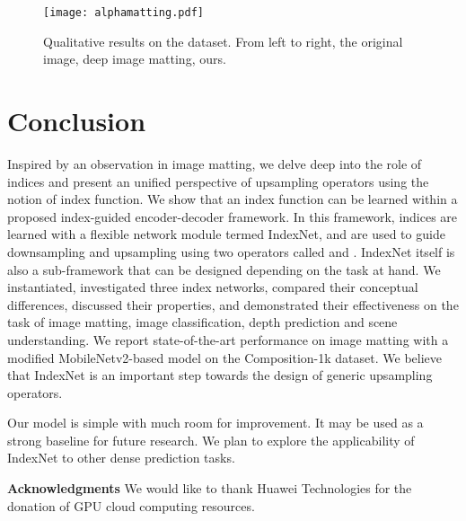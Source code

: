 \documentclass[10pt,twocolumn,letterpaper]{article}
\begin{document}
\begin{figure*}[!tb]
	\captionsetup{font=small,singlelinecheck=true}
	\setlength{\abovecaptionskip}{10pt}
	\centering
	\texttt{[image: alphamatting.pdf]}\caption{Qualitative results on the  dataset. From left to right, the original image, deep image matting, ours.}
	\label{fig:alphamatting}
\end{figure*}

\section{Conclusion}
Inspired by an observation in image matting, we delve deep into the role of indices and present an unified perspective of upsampling operators using the notion of index function. We show that an index function can be learned within a proposed index-guided encoder-decoder framework. In this framework, indices are learned with a flexible network module termed IndexNet, and are used to guide downsampling and upsampling using two operators called  and . IndexNet itself is also a sub-framework that can be designed depending on the task at hand. We instantiated, investigated three index networks, compared their conceptual differences, discussed their properties, and demonstrated their effectiveness on the task of image matting, image classification, depth prediction and scene understanding. We report state-of-the-art performance on image matting with a modified MobileNetv2-based model on the Composition-1k dataset. We believe that
IndexNet is an important step towards the design of generic upsampling operators.

Our model is simple with much room for improvement. It may be used as a strong baseline for future research. We plan to explore the applicability of IndexNet to other dense prediction tasks.


{\bf Acknowledgments}
We would like to thank Huawei Technologies for the donation of GPU cloud computing resources.

{\small


}
\end{document}
